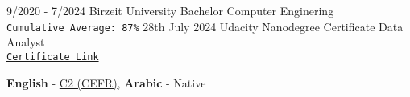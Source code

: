 \documentclass[9pt]{developercv} %
\begin{document}
\vspace{-10 pt}
\begin{entrylist}
    \entry
		{9/2020 - 7/2024}
		{Birzeit University}
		{Bachelor}
		{Computer Enginering\\
        \texttt{Cumulative Average: 87\%}
    }
    \entry
        {28th July 2024}
        {Udacity}
        {Nanodegree Certificate}
        {Data Analyst\\
        \href{https://www.udacity.com/certificate/e/3aa7c17a-0cbc-11ef-b565-af2bfee1c67d}{\texttt{Certificate Link}}
    }
\end{entrylist}





\vspace{-10 pt}
    \vspace{-6pt}
    
    \hspace{26mm} \textbf{English} - \href{https://cert.efset.org/Lymieh}{C2 (CEFR)}, \textbf{ Arabic} - Native \\
    \hspace{26mm} 
\end{document}
